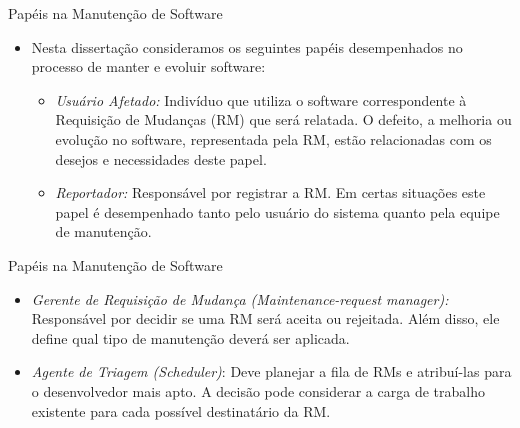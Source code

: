 \documentclass[t,14pt,mathserif]{beamer}
\begin{document}
\begin{frame}{Papéis na Manutenção de Software}
	\begin{itemize}
        \item Nesta dissertação consideramos os seguintes papéis desempenhados
            no processo de manter e evoluir software:
            \begin{itemize}
                \item \textit{Usuário Afetado:} Indivíduo que utiliza o software
                    correspondente à Requisição de Mudanças (RM) que será
                    relatada. O defeito, a melhoria ou evolução no software,
                    representada pela RM, estão relacionadas com os desejos e
                    necessidades deste papel.

                \item \textit{Reportador:} Responsável por registrar a RM\@. Em
                    certas situações este papel é desempenhado tanto pelo
                    usuário do sistema quanto pela equipe de manutenção.
            \end{itemize}
	\end{itemize}
\end{frame}

\begin{frame}{Papéis na Manutenção de Software}
	\begin{itemize}
        \item \textit{Gerente de Requisição de Mudança (Maintenance-request
                manager):} Res\-pon\-sá\-vel por decidir se uma RM será aceita
            ou rejeitada. Além disso, ele define qual tipo de manutenção deverá
            ser aplicada.

        \item \textit{Agente de Triagem (Scheduler)}: Deve planejar a fila de
            RMs e atribuí-las para o desenvolvedor mais apto. A decisão pode
            considerar a carga de trabalho existente para cada possível
            destinatário da RM\@.
	\end{itemize}
\end{frame}
\end{document}
